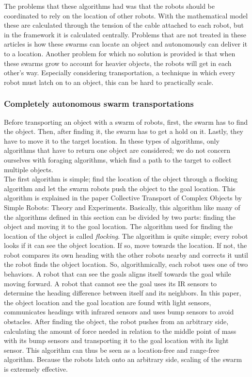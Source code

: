 The problems that these algorithms had was that the robots should be coordinated to rely on the location of other robots.
With the mathematical model these are calculated through the tension of the cable attached to each robot, but in the framework it is calculated centrally. 
Problems that are not treated in these articles is how these swarms can locate an object and autonomously can deliver it to a location. 
Another problem for which no solution is provided is that when these swarms grow to account for heavier objects, the robots will get in each other's way. 
Especially considering transportation, a technique in which every robot must latch on to an object, this can be hard to practically scale. 

\subsubsection{Completely autonomous swarm transportations}
Before transporting an object with a swarm of robots, first, the swarm has to find the object. Then, after finding it, the swarm has to get a hold on it. Lastly, they have to move it to the target location. In these types of algorithms, only algorithms that have to return one object are considered; we do not concern ourselves with foraging algorithms, which find  a path to the target to collect multiple objects. \\

The first algorithm is simple; find the location of the object through a flocking algorithm and let the swarm robots push the object to the goal location. 
This algorithm is explained in the paper Collective Transport of Complex Objects by Simple Robots: Theory and Experiments. \cite{Rubenstein2013}
Basically, this algorithm like many of the algorithms defined in this section can be divided by two parts: finding the object and moving it to the goal location.
The algorithm used for finding the location of the object is called \emph{flocking}. The algorithm is quite simple; every robot looks if it can see the object location. If so, move towards the location. If not, the robot compares its own heading with the other robots nearby and corrects it until the robot finds the object location.
So, algorithmically, each robot uses one of two behaviors. A robot that can see the goals aligns itself towards the goal while moving forward. A robot that cannot see the goal uses its IR sensors to determine the heading difference between itself and its neighbors. In this paper, the object location and the goal location are found with light sensors, communicates headings with infrared sensors and uses bump sensors to avoid obstacles. After finding the object, the robot pushes from an arbitrary side, calculating the amount of force needed in relation to the middle point of mass with its bump sensors and transporting it to the goal location with its light sensor.  This algorithm can thus be seen as a location-free and range-free algorithm.  Because the robots latch onto an arbitrary side, scaling of the swarm is extremely effective. \\ 

